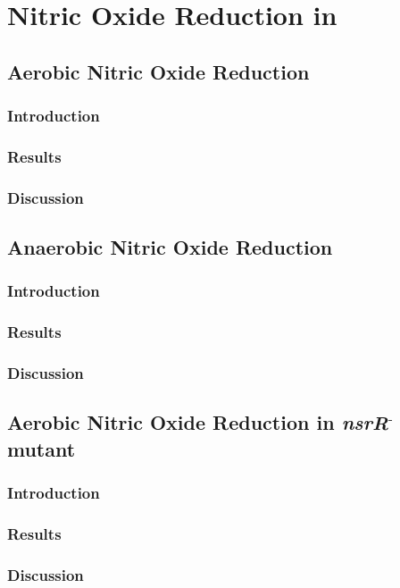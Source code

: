 \chapter{Nitric Oxide Reduction in \Nm}
\section{Aerobic Nitric Oxide Reduction}
\subsection{Introduction}
\subsection{Results}
\subsection{Discussion}
\section{Anaerobic Nitric Oxide Reduction}
\subsection{Introduction}
\subsection{Results}
\subsection{Discussion}
\section{Aerobic Nitric Oxide Reduction in \textit{nsrR$^\textrm{-}$} mutant}
\subsection{Introduction}
\subsection{Results}
\subsection{Discussion}